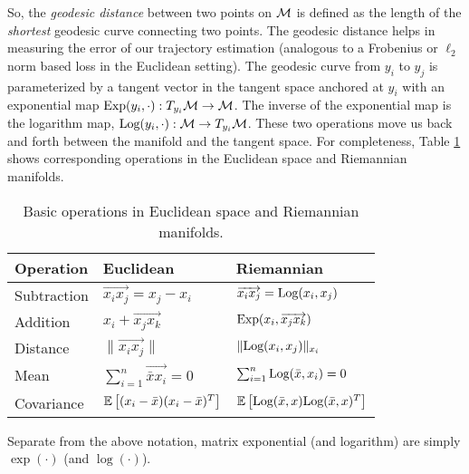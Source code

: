 So, the \textit{geodesic distance}
between two points on $\mathcal{M}$ is defined as the length of the {\em shortest} geodesic curve connecting two points.
The geodesic distance helps in measuring the error of our trajectory estimation (analogous to a Frobenius or $\ell_2$ norm based loss in the Euclidean setting).
The geodesic curve from $y_i$ to $y_j$  is parameterized by a tangent vector in the tangent space anchored at $y_i$ with an exponential map $\text{Exp}(y_i,\cdot ): T_{y_i}\mathcal{M} \rightarrow \mathcal{M}$. 
The inverse of the exponential map is the logarithm map, $\text{Log}(y_i,\cdot):\mathcal{M} \rightarrow T_{y_i}\mathcal{M}$. These two operations move us back and forth between 
the manifold and the tangent space. For completeness, Table \ref{tab:comp1} shows corresponding operations in the Euclidean space and Riemannian manifolds.
\begin{table}
	{
		\begin{center}
			\begin{tabular}{| l | l | l | }
				\hline
				Operation & Euclidean & Riemannian  \\  
				\hline 
				Subtraction & $\overrightarrow{x_i x_j} = x_j - x_i$ & $\overrightarrow{x_i x_j} = \text{Log}(x_i,x_j)$ \\ 
				 Addition & $x_i + \overrightarrow{x_j x_k}$ & $\text{Exp}(x_i,\overrightarrow{x_j x_k})$ \\     
				 Distance  & $\| \overrightarrow{x_i x_j} \|$ & $\|\text{Log}(x_i,x_j) \|_{x_i}$ \\ 
				Mean  & $\sum_{i=1}^{n} \overrightarrow{\bar{x}x_{i}}=0$ &  $\sum_{i=1}^{n} \text{Log}(\bar{x}, x_i)=0$  \\ 
				Covariance & $\mathbb{E} \left [ (x_i - \bar{x})(x_i - \bar{x})^{T} \right ]$& $\mathbb{E} \left [ \text{Log}(\bar{x}, x)\text{Log}(\bar{x}, x)^{T} \right ]$\\ [1ex] \hline 
			\end{tabular}
		\end{center}
	}
	\caption{\label{tab:comp1} Basic operations in Euclidean space and Riemannian manifolds.}
\end{table}
Separate from the above notation, matrix exponential (and logarithm) are simply $\exp(\cdot)$ (and $\log(\cdot)$).  
